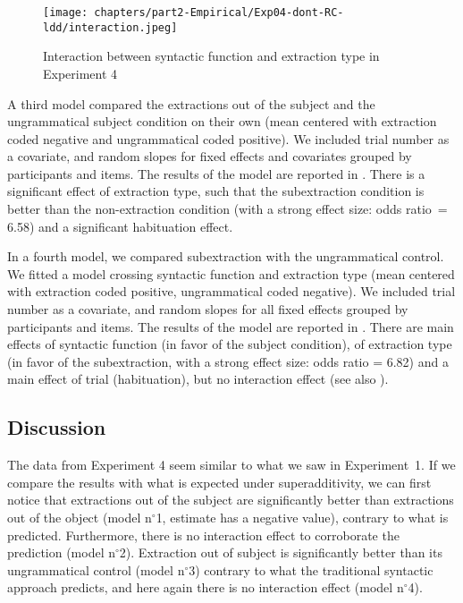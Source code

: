 

\begin{figure}
    \centering
    \texttt{[image: chapters/part2-Empirical/Exp04-dont-RC-ldd/interaction.jpeg]}
    \caption{Interaction between syntactic function and extraction type in Experiment 4}
    \label{fig:exp04-interaction1}
\end{figure}

\pagebreak
A third model compared the extractions out of the subject and the ungrammatical subject condition on their own (mean centered with extraction coded negative and ungrammatical coded positive). We included trial number as a covariate, and random slopes for fixed effects and covariates grouped by participants and items. The results of the model are reported in . 
There is a significant effect of extraction type, such that the subextraction condition is better than the non-extraction condition (with a strong effect size: odds ratio~= 6.58) and a significant habituation effect. 



In a fourth model, we compared subextraction with the ungrammatical control. We fitted a model crossing syntactic function and extraction type (mean centered with extraction coded positive, ungrammatical coded negative). We included trial number as a covariate, and random slopes for all fixed effects grouped by participants and items. The results of the model are reported in . 
There are main effects of syntactic function (in favor of the subject condition), of extraction type (in favor of the subextraction, with a strong effect size: odds ratio = 6.82) and a main effect of trial (habituation), but no interaction effect (see also ).



\subsection{Discussion}

The data from Experiment 4 seem similar to what we saw in Experiment~1. If we compare the results with what is expected under superadditivity, we can first notice that extractions out of the subject are significantly better than extractions out of the object (model n$^{\circ}$1, estimate has a negative value), contrary to what is predicted. Furthermore, there is no interaction effect to corroborate the prediction (model n$^{\circ}$2). Extraction out of subject is significantly better than its ungrammatical control (model n$^{\circ}$3) contrary to what the traditional syntactic approach predicts, and here again there is no interaction effect (model n$^{\circ}$4).

